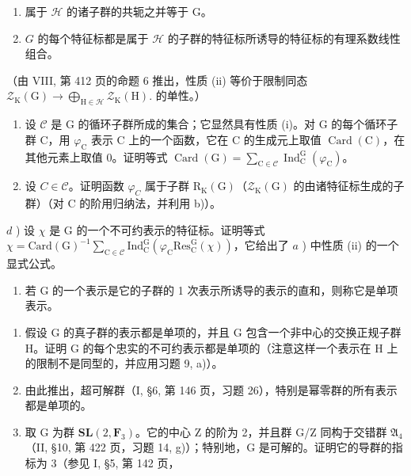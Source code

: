 \begin{enumerate}
\def\labelenumi{(\roman{enumi})}
\item
  属于 \(\mathcal{H}\) 的诸子群的共轭之并等于 G。
\item
  \(G\) 的每个特征标都是属于 \(\mathcal{H}\) 的子群的特征标所诱导的特征标的有理系数线性组合。
\end{enumerate}

（由 VIII, 第 412 页的命题 6 推出，性质 (ii) 等价于限制同态 \(\mathcal{Z}_{\mathrm{K}}(\mathrm{G})\to \bigoplus_{\mathrm{H}\in \mathcal{H}}\mathcal{Z}_{\mathrm{K}}(\mathrm{H}).\) 的单性。）

\begin{enumerate}
\def\labelenumi{\alph{enumi})}
\setcounter{enumi}{1}
\item
  设 \(\mathcal{C}\) 是 G 的循环子群所成的集合；它显然具有性质 (i)。对 G 的每个循环子群 C，用 \(\varphi_{\mathrm{C}}\) 表示 C 上的一个函数，它在 C 的生成元上取值 \(\operatorname{Card}(\mathrm{C})\)，在其他元素上取值 0。证明等式 \(\operatorname{Card}(\mathrm{G}) = \sum_{\mathrm{C} \in \mathcal{C}} \operatorname{Ind}_{\mathrm{C}}^{\mathrm{G}}(\varphi_{\mathrm{C}})\)。
\item
  设 \(C \in \mathcal{C}\)。证明函数 \(\varphi_{C}\) 属于子群 \(\mathrm{R}_{\mathrm{K}}(\mathrm{G})\)（\(\mathcal{Z}_{\mathrm{K}}(\mathrm{G})\) 的由诸特征标生成的子群）（对 C 的阶用归纳法，并利用 b)）。
\end{enumerate}

\(d\) ) 设 \(\chi\) 是 G 的一个不可约表示的特征标。证明等式 \(\chi = \mathrm{Card}(\mathrm{G})^{-1}\sum_{\mathrm{C}\in \mathcal{C}}\mathrm{Ind}_{\mathrm{C}}^{\mathrm{G}}(\varphi_{\mathrm{C}}\mathrm{Res}_{\mathrm{C}}^{\mathrm{G}}(\chi))\)，它给出了 \(a\) ) 中性质 (ii) 的一个显式公式。

\begin{enumerate}
\def\labelenumi{\arabic{enumi})}
\setcounter{enumi}{13}
\tightlist
\item
  若 G 的一个表示是它的子群的 1 次表示所诱导的表示的直和，则称它是单项表示。
\end{enumerate}

\begin{enumerate}
\def\labelenumi{\alph{enumi})}
\item
  假设 G 的真子群的表示都是单项的，并且 G 包含一个非中心的交换正规子群 H。证明 G 的每个忠实的不可约表示都是单项的（注意这样一个表示在 H 上的限制不是同型的，并应用习题 9, a)）。
\item
  由此推出，超可解群（I, §6, 第 146 页，习题 26），特别是幂零群的所有表示都是单项的。
\item
  取 G 为群 \(\mathbf{SL}(2,\mathbf{F}_{3})\)。它的中心 Z 的阶为 2，并且群 G/Z 同构于交错群 \(\mathfrak{A}_{4}\)（II, §10, 第 422 页，习题 14, g)）；特别地，G 是可解的。证明它的导群的指标为 3（参见 I, §5, 第 142 页，
\end{enumerate}

